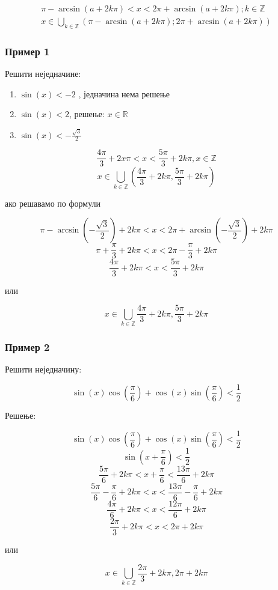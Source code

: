 \documentclass[a4paper,12pt]{article}
\begin{document}
\begin{equation}
\begin{split}
\pi-\arcsin(a+2k\pi)<x<2\pi+\arcsin(a+2k\pi);k\in\mathbb{Z}\\
x\in\bigcup\limits_{k\in\mathbb{Z}}(\pi-\arcsin(a+2k\pi);2\pi+\arcsin(a+2k\pi))
\end{split}
\end{equation}


\subsubsection{Пример 1}

Решити неједначине:

\begin{enumerate}[label=\alph*)]
\item $\sin(x)<-2$ , једначина нема решење
\item $\sin(x)<2$, решење: $x\in\mathbb{R}$
\item $\sin(x)<-\frac{\sqrt3}{2}$
\end{enumerate}


\[\frac{4\pi}{3}+2x\pi<x<\frac{5\pi}{3}+2k\pi,x\in\mathbb{Z}\]
\[x\in\bigcup_{k\in\mathbb{Z}}(\frac{4\pi}{3}+2k\pi,\frac{5\pi}{3}+2k\pi)\]

ако решавамо по формули

\[\pi-\arcsin\left(-\frac{\sqrt{3}}{2}\right)+2k\pi<x<2\pi+\arcsin\left(-\frac{\sqrt{3}}{2}\right)+2k\pi\]
\[\pi+\frac{\pi}{3}+2k\pi<x<2\pi-\frac{\pi}{3}+2k\pi\]
\[\frac{4\pi}{3}+2k\pi<x<\frac{5\pi}{3}+2k\pi\]
\centerline{или}
\[x\in\bigcup_{k\in\mathbb{Z}}\frac{4\pi}{3}+2k\pi,\frac{5\pi}{3}+2k\pi\]


\subsubsection{Пример 2}

Решити неједначину:

\[\sin(x)\cos\left(\frac{\pi}{6}\right)+\cos(x)\sin\left(\frac{\pi}{6}\right)<\frac{1}{2}\]

Решење:

\[\sin(x)\cos\left(\frac{\pi}{6}\right)+\cos(x)\sin\left(\frac{\pi}{6}\right)<\frac{1}{2}\]
\[\sin\left(x+\frac{\pi}{6}\right)<\frac{1}{2}\]
\[\frac{5\pi}{6}+2k\pi<x+\frac{\pi}{6}<\frac{13\pi}{6}+2k\pi\]
\[\frac{5\pi}{6}-\frac{\pi}{6}+2k\pi<x<\frac{13\pi}{6}-\frac{\pi}{6}+2k\pi\]
\[\frac{4\pi}{6}+2k\pi<x<\frac{12\pi}{6}+2k\pi\]
\[\frac{2\pi}{3}+2k\pi<x<2\pi+2k\pi\]
\centerline{или}
\[x\in\bigcup_{k\in\mathbb{Z}}\frac{2\pi}{3}+2k\pi,2\pi+2k\pi\]
\end{document}
